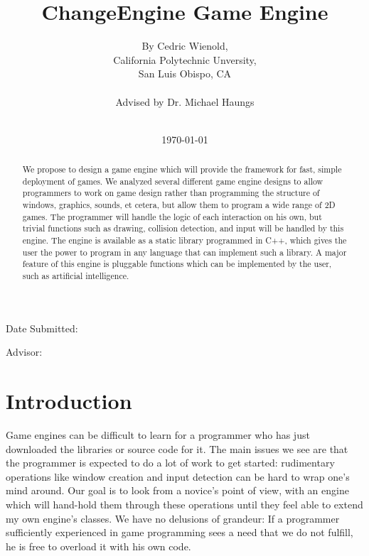 \documentclass[12pt]{article}
\title{ChangeEngine Game Engine}
\author{By Cedric Wienold,\\
California Polytechnic Unversity,\\
San Luis Obispo, CA\\\\
Advised by Dr. Michael Haungs\\\\}
\date{\today}
\begin{document}
  
  \maketitle

  \thispagestyle{empty}

  \vfill

  \begin{flushright}
    
    Date Submitted:\makebox[1.5in]{\hrulefill}

    \vspace{12pt}
    
    Advisor:\makebox[1.5in]{\hrulefill}
  \end{flushright}

  \newpage
  

  \tableofcontents

  \newpage

  \begin{abstract}
    We propose to design a game engine which will provide the framework for fast, simple deployment of games. We analyzed several different game engine designs to allow programmers to work on game design rather than programming the structure of windows, graphics, sounds, et cetera, but allow them to program a wide range of 2D games. The programmer will handle the logic of each interaction on his own, but trivial functions such as drawing, collision detection, and input will be handled by this engine. The engine is available as a static library programmed in C++, which gives the user the power to program in any language that can implement such a library. A major feature of this engine is pluggable functions which can be implemented by the user, such as artificial intelligence.
  \end{abstract}
  
  \newpage
  

  \section{Introduction}
    Game engines can be difficult to learn for a programmer who has just downloaded the libraries or source code for it. The main issues we see are that the programmer is expected to do a lot of work to get started: rudimentary operations like window creation and input detection can be hard to wrap one's mind around. Our goal is to look from a novice's point of view, with an engine which will hand-hold them through these operations until they feel able to extend my own engine's classes. We have no delusions of grandeur: If a programmer sufficiently experienced in game programming sees a need that we do not fulfill, he is free to overload it with his own code.
\end{document}
